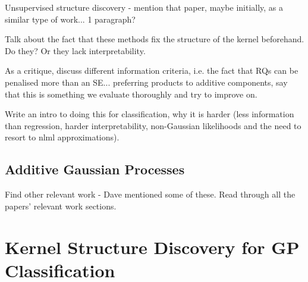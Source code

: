 \documentclass[a4paper,12pt ]{report}
\begin{document}
Unsupervised structure discovery - mention that paper, maybe initially, as a similar type of work... 1 paragraph? 

Talk about the fact that these methods fix the structure of the kernel beforehand. Do they? Or they lack interpretability.





As a critique, discuss different information criteria, i.e. the fact that RQs can be penalised more than an SE... preferring products to additive components, say that this is something we evaluate thoroughly and try to improve on. 

Write an intro to doing this for classification, why it is harder (less information than regression, harder interpretability, non-Gaussian likelihoods and the need to resort to nlml approximations). 


\section{Additive Gaussian Processes}

Find other relevant work - Dave mentioned some of these. Read through all the papers' relevant work sections. 


\clearpage

\chapter{Kernel Structure Discovery for GP Classification} 
\end{document}

